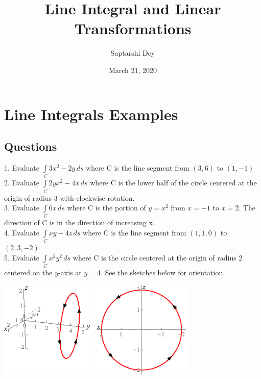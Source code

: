 \documentclass[14pt]{article}
\begin{document}
	\title{Line Integral and Linear Transformations}
	\author{Saptarshi Dey}
	\date{March 21, 2020}
	\maketitle
	\section{Line Integrals Examples}
	\subsection{Questions}
	\large{
		1. Evaluate $\displaystyle \int\limits_{C}{{3{x^2} - 2y \,ds}}$ where C is the line segment from $\left( {3,6} \right)$ to $\left( {1,-1} \right)$}
	\\ \large{
		2. Evaluate $\displaystyle \int\limits_{C}{{2y{x^2} - 4x\,ds}}$ where C is the lower half of the circle centered at the origin of radius 3 with clockwise rotation.}
	\\ \large{
		3. Evaluate $\displaystyle \int\limits_{C}{{6x\,ds}}$ where C is the portion of $y = {x^2}$ from $x=-1$ to $x=2$. The direction of C is in the direction of increasing x.}
	\\ \large{
		4. Evaluate $\displaystyle \int\limits_{C}{{xy - 4z\,ds}}$ where C is the line segment from $\left( {1,1,0} \right)$ to $\left( {2,3,-2} \right)$}
	\\ \large{
		5. Evaluate $\displaystyle \int\limits_{C}{{{x^2}{y^2}\,ds}}$ where C is the circle centered at the origin of radius 2 centered on the $y$-axis at $y=4$. See the sketches below for orientation.}
	\\ \begin{center}
		\includegraphics[width=0.35\textwidth]{"./Pictures/Q5_1.png"}
		\includegraphics[width=0.35\textwidth]{"./Pictures/Q5_2.png"}
	\end{center}
\end{document}
